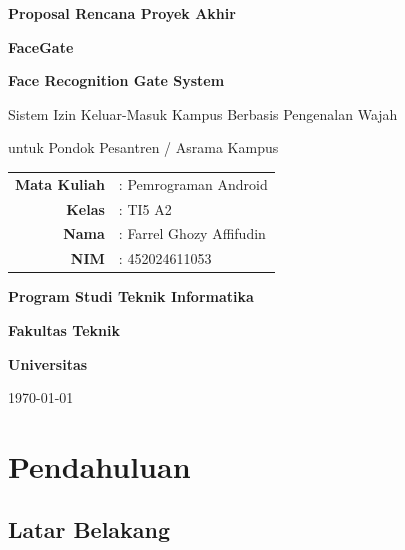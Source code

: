 \documentclass[12pt,a4paper]{article}
\newcommand{\appname}{FaceGate}
\newcommand{\pagetitle}{Proposal Rencana Proyek Akhir}
\begin{document}
\begin{titlepage}
  \centering

  \vspace*{1cm}

  {\LARGE\bfseries\color{primary} \pagetitle \par}
  \vspace{0.5cm}
  {\Huge\bfseries\color{secondary} \appname \par}
  {\Large\bfseries\color{secondary} Face Recognition Gate System\par}
  \vspace{0.3cm}
  {\large Sistem Izin Keluar-Masuk Kampus Berbasis Pengenalan Wajah\par}
  {\large untuk Pondok Pesantren / Asrama Kampus\par}

  \vspace{1.5cm}

  \begin{minipage}{0.6\textwidth}
    \centering
    \begin{tabular}{rl}
      \textbf{Mata Kuliah} & : Pemrograman Android \\
      \textbf{Kelas}       & : TI5 A2 \\
      \textbf{Nama}        & : Farrel Ghozy Affifudin \\
      \textbf{NIM}         & : 452024611053 \\
    \end{tabular}
  \end{minipage}

  \vspace{2cm}

  {\large\textbf{Program Studi Teknik Informatika}\par}
  {\large\textbf{Fakultas Teknik}\par}
  {\large\textbf{Universitas}\par}
  {\large\today\par}

  \vfill
\end{titlepage}

\newpage
\tableofcontents
\newpage

\section{Pendahuluan}

\subsection{Latar Belakang}
\end{document}
